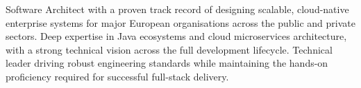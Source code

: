 

\begin{cvparagraph}

Software Architect with a proven track record of designing scalable, cloud-native enterprise systems for major European organisations across the public and private sectors. Deep expertise in Java ecosystems and cloud microservices architecture, with a strong technical vision across the full development lifecycle. Technical leader driving robust engineering standards while maintaining the hands-on proficiency required for successful full-stack delivery.

\end{cvparagraph}
